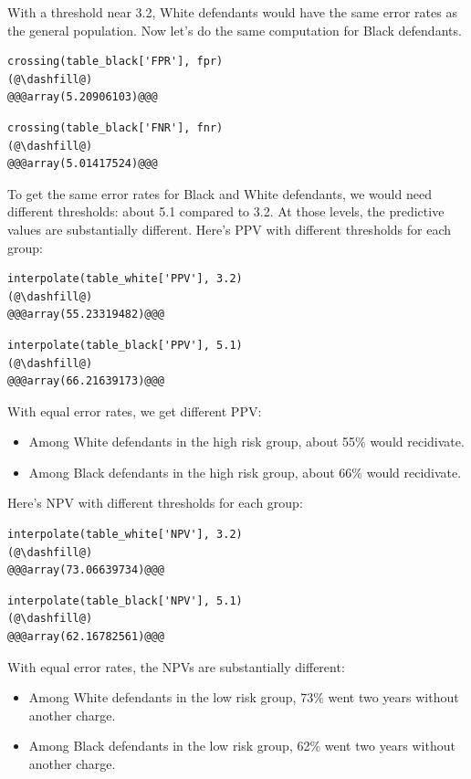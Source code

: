 With a threshold near 3.2, White defendants would have the same error
rates as the general population. Now let's do the same computation for
Black defendants.

\begin{lstlisting}[]
crossing(table_black['FPR'], fpr)
(@\dashfill@)
@@@array(5.20906103)@@@
\end{lstlisting}

\begin{lstlisting}[]
crossing(table_black['FNR'], fnr)
(@\dashfill@)
@@@array(5.01417524)@@@
\end{lstlisting}

To get the same error rates for Black and White defendants, we would
need different thresholds: about 5.1 compared to 3.2. At those levels,
the predictive values are substantially different. Here's PPV with
different thresholds for each group:

\begin{lstlisting}[]
interpolate(table_white['PPV'], 3.2)
(@\dashfill@)
@@@array(55.23319482)@@@
\end{lstlisting}

\begin{lstlisting}[]
interpolate(table_black['PPV'], 5.1)
(@\dashfill@)
@@@array(66.21639173)@@@
\end{lstlisting}

With equal error rates, we get different PPV:

\begin{itemize}
\item
  Among White defendants in the high risk group, about 55\% would
  recidivate.
\item
  Among Black defendants in the high risk group, about 66\% would
  recidivate.
\end{itemize}

Here's NPV with different thresholds for each group:

\begin{lstlisting}[]
interpolate(table_white['NPV'], 3.2)
(@\dashfill@)
@@@array(73.06639734)@@@
\end{lstlisting}

\begin{lstlisting}[]
interpolate(table_black['NPV'], 5.1)
(@\dashfill@)
@@@array(62.16782561)@@@
\end{lstlisting}

With equal error rates, the NPVs are substantially different:

\begin{itemize}
\item
  Among White defendants in the low risk group, 73\% went two years
  without another charge.
\item
  Among Black defendants in the low risk group, 62\% went two years
  without another charge.
\end{itemize}

